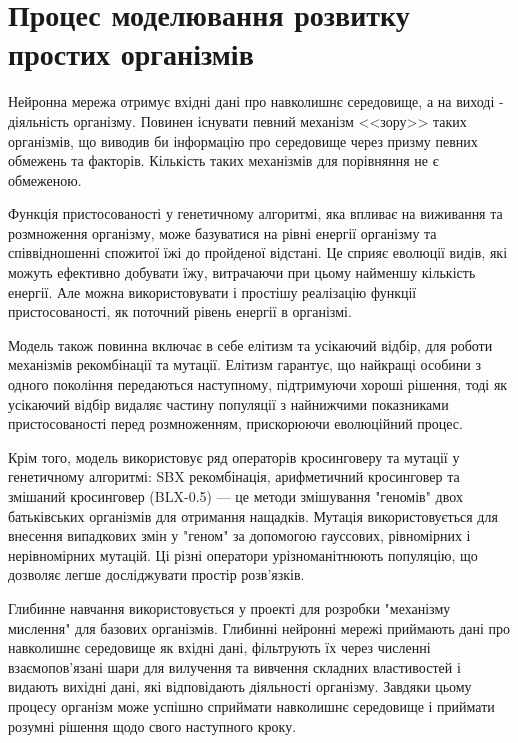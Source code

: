 \section{Процес моделювання розвитку простих організмів}

Нейронна мережа отримує вхідні дані про навколишнє середовище, 
а на виході - діяльність організму. 
Повинен існувати певний механізм <<зору>> таких організмів,
що виводив би інформацію про середовище через призму певних
обмежень та факторів.
Кількість таких механізмів для порівняння не є обмеженою.

Функція пристосованості у генетичному алгоритмі, 
яка впливає на виживання та розмноження організму, 
може базуватися на рівні енергії організму та 
співвідношенні спожитої їжі до пройденої відстані. 
Це сприяє еволюції видів, які можуть ефективно добувати їжу, 
витрачаючи при цьому найменшу кількість енергії.
Але можна використовувати і простішу реалізацію функції пристосованості,
як поточний рівень енергії в організмі.

Модель також повинна включає в себе елітизм та усікаючий відбір,
для роботи механізмів рекомбінації та мутації.
Елітизм гарантує, що найкращі особини з одного покоління 
передаються наступному, підтримуючи хороші рішення, 
тоді як усікаючий відбір видаляє частину популяції з найнижчими 
показниками пристосованості перед розмноженням, 
прискорюючи еволюційний процес.

Крім того, модель використовує ряд операторів 
кросинговеру та мутації у генетичному алгоритмі:
SBX рекомбінація, 
арифметичний кросинговер 
та змішаний кросинговер (BLX-0.5) --- 
це методи змішування "геномів" двох батьківських 
організмів для отримання нащадків. 
Мутація використовується для внесення випадкових 
змін у "геном" за допомогою гауссових, 
рівномірних і нерівномірних мутацій. 
Ці різні оператори урізноманітнюють популяцію, 
що дозволяє легше досліджувати простір розв'язків.

Глибинне навчання використовується у проекті для розробки 
"механізму мислення" для базових організмів. 
Глибинні нейронні мережі приймають дані про навколишнє середовище 
як вхідні дані, фільтрують їх через численні взаємопов'язані 
шари для вилучення та вивчення складних властивостей 
і видають вихідні дані, які відповідають діяльності організму. 
Завдяки цьому процесу організм може успішно сприймати навколишнє 
середовище і приймати розумні рішення щодо свого наступного кроку.

